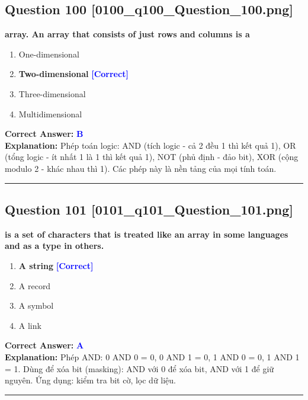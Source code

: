 \documentclass[11pt,a4paper]{article}
\begin{document}
\begin{minipage}{\textwidth}
\subsection*{Question 100 \quad \footnotesize{[0100\_q100\_Question\_100.png]}}
\noindent \textbf{array. An array that consists of just rows and columns is a}

\begin{enumerate}[label=\Alph*.]
    \item One-dimensional
    \item \textbf{Two-dimensional} \hfill \textcolor{blue}{\textbf{[Correct]}}
    \item Three-dimensional
    \item Multidimensional
\end{enumerate}

\noindent \textbf{Correct Answer:} \textcolor{blue}{\textbf{B}} \\[2pt]
\noindent \textbf{Explanation:} Phép toán logic: AND (tích logic - cả 2 đều 1 thì kết quả 1), OR (tổng logic - ít nhất 1 là 1 thì kết quả 1), NOT (phủ định - đảo bit), XOR (cộng modulo 2 - khác nhau thì 1). Các phép này là nền tảng của mọi tính toán.

\par\vspace{0.3cm}
\hrule
\vspace{0.3cm}
\end{minipage}

\begin{minipage}{\textwidth}
\subsection*{Question 101 \quad \footnotesize{[0101\_q101\_Question\_101.png]}}
\noindent \textbf{is a set of characters that is treated like an array in some languages and as a type in others.}

\begin{enumerate}[label=\Alph*.]
    \item \textbf{A string} \hfill \textcolor{blue}{\textbf{[Correct]}}
    \item A record
    \item A symbol
    \item A link
\end{enumerate}

\noindent \textbf{Correct Answer:} \textcolor{blue}{\textbf{A}} \\[2pt]
\noindent \textbf{Explanation:} Phép AND: 0 AND 0 = 0, 0 AND 1 = 0, 1 AND 0 = 0, 1 AND 1 = 1. Dùng để xóa bit (masking): AND với 0 để xóa bit, AND với 1 để giữ nguyên. Ứng dụng: kiểm tra bit cờ, lọc dữ liệu.

\par\vspace{0.3cm}
\hrule
\vspace{0.3cm}
\end{minipage}
\end{document}
